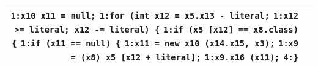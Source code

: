 \documentclass[]{article}
\begin{document}
\begin{minipage}{\textwidth}
\begin{tabular}{rp{12.5cm}}
	\verb|1:x10 x11 = null;|\newline
	\verb|1:for (int x12 = x5.x13 - literal;|\newline
	\verb|1:x12 >= literal; x12 -= literal) {|\newline
	\verb|1:if (x5 [x12] == x8.class) {|\newline
	\verb|1:if (x11 == null) {|\newline
	\verb|1:x11 = new x10 (x14.x15, x3);|\newline
	\verb|1:x9 = (x8) x5 [x12 + literal];|\newline
	\verb|1:x9.x16 (x11);|\newline
	\verb|4:}| \\
	\bottomrule[2pt]
	\end{tabular}
	\end{minipage}\\\\
	
\end{document}
